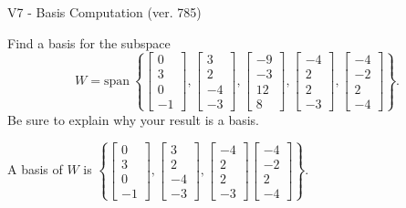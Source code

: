 \begin{exercise}
  \begin{exerciseTitle}V7 - Basis Computation (ver. 785)\end{exerciseTitle}
  \begin{exerciseStatement}
    Find a basis for the subspace 
\[W=\mathrm{span}\ \left\{\left[\begin{array}{r}
0 \\
3 \\
0 \\
-1
\end{array}\right] , \left[\begin{array}{r}
3 \\
2 \\
-4 \\
-3
\end{array}\right] , \left[\begin{array}{r}
-9 \\
-3 \\
12 \\
8
\end{array}\right] , \left[\begin{array}{r}
-4 \\
2 \\
2 \\
-3
\end{array}\right] , \left[\begin{array}{r}
-4 \\
-2 \\
2 \\
-4
\end{array}\right]\right\}.\]
 Be sure to explain why your result is a basis.


  \end{exerciseStatement}
  \begin{exerciseAnswer}
   A basis of \(W\) is  \(\left\{\left[\begin{array}{r}
0 \\
3 \\
0 \\
-1
\end{array}\right] , \left[\begin{array}{r}
3 \\
2 \\
-4 \\
-3
\end{array}\right] , \left[\begin{array}{r}
-4 \\
2 \\
2 \\
-3
\end{array}\right] \left[\begin{array}{r}
-4 \\
-2 \\
2 \\
-4
\end{array}\right]\right\}\).
  


  \end{exerciseAnswer}
\end{exercise}